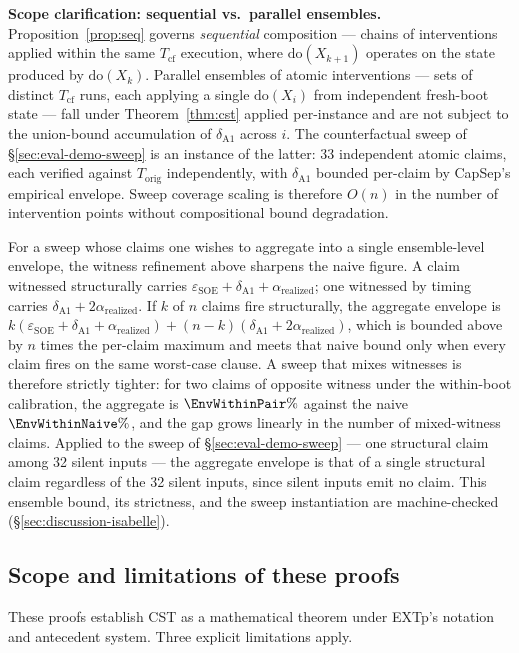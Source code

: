 \documentclass[conference]{IEEEtran}
\newcommand{\Korig}{T_\text{orig}}
\newcommand{\Tcf}{T_\text{cf}}
\newcommand{\arealized}{\alpha_\text{realized}}
\newcommand{\epsSOE}{\varepsilon_\text{SOE}}
\begin{document}
\textbf{Scope clarification: sequential vs.\ parallel ensembles.}
Proposition~\ref{prop:seq} governs \emph{sequential} composition --- chains of
interventions applied within the same $\Tcf$ execution, where
$\text{do}(X_{k+1})$ operates on the state produced by
$\text{do}(X_k)$. Parallel ensembles of atomic interventions ---
sets of distinct $\Tcf$ runs, each applying a single
$\text{do}(X_i)$ from independent fresh-boot state --- fall under
Theorem~\ref{thm:cst} applied per-instance and are not subject to
the union-bound accumulation of $\delta_{\text{A1}}$ across $i$.
The counterfactual sweep of \S\ref{sec:eval-demo-sweep} is an
instance of the latter: 33 independent atomic claims, each
verified against $\Korig$ independently, with $\delta_{\text{A1}}$
bounded per-claim by CapSep's empirical envelope. Sweep coverage
scaling is therefore $O(n)$ in the number of intervention points
without compositional bound degradation.

For a sweep whose claims one wishes to aggregate into a single
ensemble-level envelope, the witness refinement above sharpens the
naive figure. A claim witnessed structurally carries
$\epsSOE + \delta_{\text{A1}} + \arealized$; one witnessed by
timing carries $\delta_{\text{A1}} + 2\arealized$. If $k$ of $n$
claims fire structurally, the aggregate envelope is
$k(\epsSOE + \delta_{\text{A1}} + \arealized) +
(n{-}k)(\delta_{\text{A1}} + 2\arealized)$, which is bounded above
by $n$ times the per-claim maximum and meets that naive bound only
when every claim fires on the same worst-case clause. A sweep that
mixes witnesses is therefore strictly tighter: for two claims of
opposite witness under the within-boot calibration, the aggregate
is $\EnvWithinPair\%$ against the naive $\EnvWithinNaive\%$, and the gap grows linearly
in the number of mixed-witness claims. Applied to the sweep of
\S\ref{sec:eval-demo-sweep} --- one structural claim among 32
silent inputs --- the aggregate envelope is that of a single
structural claim regardless of the 32 silent inputs, since silent
inputs emit no claim. This ensemble bound, its strictness, and the
sweep instantiation are machine-checked
(\S\ref{sec:discussion-isabelle}).

\subsection{Scope and limitations of these proofs}

These proofs establish CST as a mathematical theorem under EXTp's
notation and antecedent system. Three explicit limitations apply.
\end{document}
